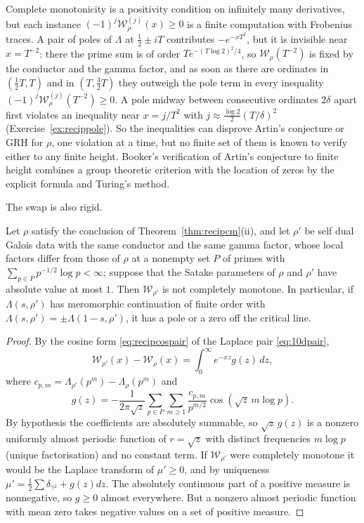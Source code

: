 Complete monotonicity is a positivity condition on infinitely many derivatives, but each instance $(-1)^j\mathcal W_\rho^{(j)}(x)\ge0$ is a finite computation with Frobenius traces. A pair of poles of $\Lambda$ at $\frac12\pm iT$ contributes $-e^{-xT^2}$, but it is invisible near $x=T^{-2}$: there the prime sum is of order $Te^{-(T\log2)^2/4}$, so $\mathcal W_\rho(T^{-2})$ is fixed by the conductor and the gamma factor, and as soon as there are ordinates in $(\frac12T,T)$ and in $(T,\frac32T)$ they outweigh the pole term in every inequality $(-1)^j\mathcal W_\rho^{(j)}(T^{-2})\ge0$. A pole midway between consecutive ordinates $2\delta$ apart first violates an inequality near $x=j/T^2$ with $j\approx\frac{\log2}2(T/\delta)^2$ (Exercise~\ref{ex:recippole}). So the inequalities can disprove Artin's conjecture or GRH for $\rho$, one violation at a time, but no finite set of them is known to verify either to any finite height. Booker's verification of Artin's conjecture to finite height \cite{booker2006} combines a group theoretic criterion with the location of zeros by the explicit formula and Turing's method.

The swap is also rigid.

\begin{proposition}\label{prop:reciprigid}
Let $\rho$ satisfy the conclusion of Theorem~\ref{thm:recipcm}(ii), and let $\rho'$ be self dual Galois data with the same conductor and the same gamma factor, whose local factors differ from those of $\rho$ at a nonempty set $P$ of primes with $\sum_{p\in P}p^{-1/2}\log p<\infty$; suppose that the Satake parameters of $\rho$ and $\rho'$ have absolute value at most $1$. Then $\mathcal W_{\rho'}$ is not completely monotone. In particular, if $\Lambda(s,\rho')$ has meromorphic continuation of finite order with $\Lambda(s,\rho')=\pm\Lambda(1-s,\rho')$, it has a pole or a zero off the critical line.
\end{proposition}

\begin{proof}
By the cosine form \eqref{eq:recipcospair} of the Laplace pair \eqref{eq:10dpair},
\[
\mathcal W_{\rho'}(x)-\mathcal W_\rho(x)=\int_0^\infty e^{-xz}g(z)\,dz,
\]
where $c_{p,m}=\Lambda_{\rho'}(p^m)-\Lambda_\rho(p^m)$ and
\[
g(z)=-\frac1{2\pi\sqrt z}\sum_{p\in P}\sum_{m\ge1}\frac{c_{p,m}}{p^{m/2}}\cos(\sqrt z\,m\log p).
\]
By hypothesis the coefficients are absolutely summable, so $\sqrt z\,g(z)$ is a nonzero uniformly almost periodic function of $r=\sqrt z$ with distinct frequencies $m\log p$ (unique factorisation) and no constant term. If $\mathcal W_{\rho'}$ were completely monotone it would be the Laplace transform of $\mu'\ge0$, and by uniqueness $\mu'=\frac12\sum\delta_{\gamma^2}+g(z)dz$. The absolutely continuous part of a positive measure is nonnegative, so $g\ge0$ almost everywhere. But a nonzero almost periodic function with mean zero takes negative values on a set of positive measure.
\end{proof}


